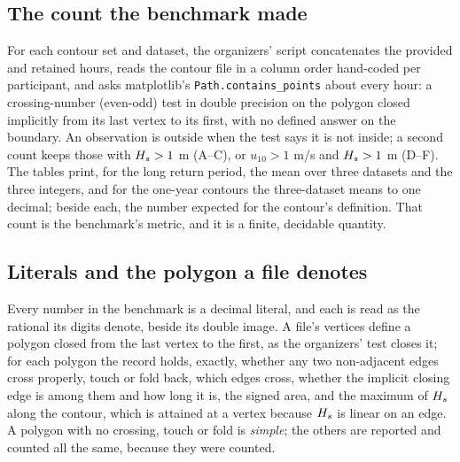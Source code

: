 \documentclass[preprint,11pt,authoryear]{elsarticle}
\begin{document}
\subsection{The count the benchmark made}
For each contour set and dataset, the organizers' script concatenates the provided and retained hours, reads the contour file in a column order hand-coded per participant, and asks matplotlib's \texttt{Path.contains\_points} \citep{hunter2007} about every hour: a crossing-number (even-odd) test in double precision on the polygon closed implicitly from its last vertex to its first, with no defined answer on the boundary. An observation is outside when the test says it is not inside; a second count keeps those with $H_s > 1$ m (A--C), or $u_{10} > 1$ m/s and $H_s > 1$ m (D--F). The tables print, for the long return period, the mean over three datasets and the three integers, and for the one-year contours the three-dataset means to one decimal; beside each, the number expected for the contour's definition. That count is the benchmark's metric, and it is a finite, decidable quantity.

\subsection{Literals and the polygon a file denotes}
Every number in the benchmark is a decimal literal, and each is read as the rational its digits denote, beside its double image. A file's vertices define a polygon closed from the last vertex to the first, as the organizers' test closes it; for each polygon the record holds, exactly, whether any two non-adjacent edges cross properly, touch or fold back, which edges cross, whether the implicit closing edge is among them and how long it is, the signed area, and the maximum of $H_s$ along the contour, which is attained at a vertex because $H_s$ is linear on an edge. A polygon with no crossing, touch or fold is \emph{simple}; the others are reported and counted all the same, because they were counted.
\end{document}
